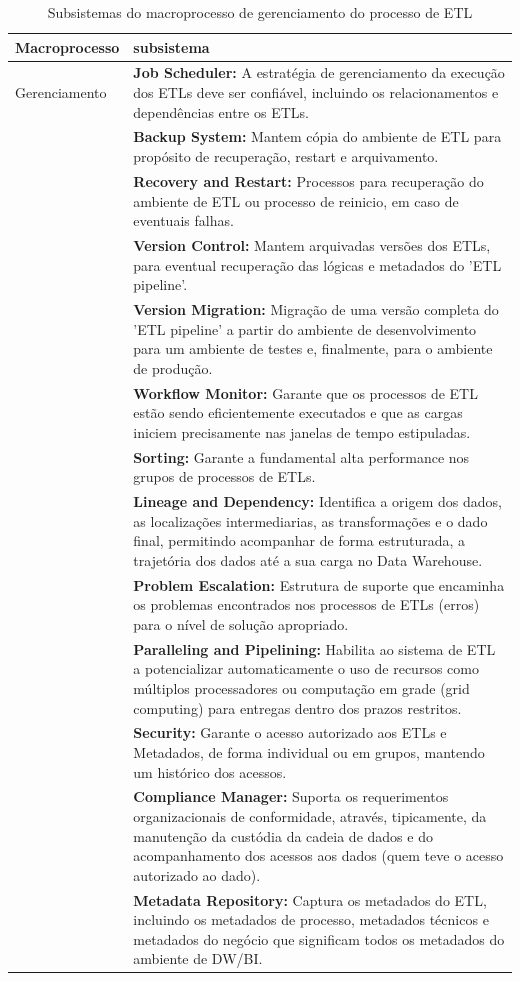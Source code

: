 \clearpage

\begin{table}[h]
	\centering
	\caption{Subsistemas do macroprocesso de gerenciamento do processo de ETL}
	\label{subgerenciamento}
	\begin{tabular}{|p{3cm}| p{11cm} |}
		\hline
		Macroprocesso & subsistema\\
		\hline
		Gerenciamento & \textbf{Job Scheduler:} A estratégia de gerenciamento da execução dos ETLs deve ser confiável, incluindo os relacionamentos e dependências entre os ETLs. \\
		& \textbf{Backup System:} Mantem cópia do ambiente de ETL para propósito de recuperação, restart e arquivamento. \\
		& \textbf{Recovery and Restart:} Processos para recuperação do ambiente de ETL  ou processo de reinicio, em caso de eventuais falhas. \\
		& \textbf{Version Control:} Mantem arquivadas versões dos ETLs, para eventual recuperação das lógicas e metadados do 'ETL pipeline'. \\
		& \textbf{Version Migration:} Migração de uma versão completa do 'ETL pipeline' a partir do ambiente de desenvolvimento para um ambiente de testes e, finalmente, para o ambiente de produção. \\
		& \textbf{Workflow Monitor:} Garante que os processos de ETL estão sendo eficientemente executados e que as cargas iniciem precisamente nas janelas de tempo estipuladas.  \\
		& \textbf{Sorting:} Garante a fundamental alta performance nos grupos de processos de ETLs. \\
		& \textbf{Lineage and Dependency:} Identifica a origem dos dados, as localizações intermediarias, as transformações e o dado final, permitindo acompanhar de forma estruturada, a trajetória dos dados até a sua carga no Data Warehouse. \\
		& \textbf{Problem Escalation:} Estrutura de suporte que  encaminha os problemas encontrados nos processos de  ETLs (erros)  para o nível de solução apropriado. \\
		& \textbf{Paralleling and Pipelining:} Habilita ao sistema de ETL a potencializar automaticamente  o uso de recursos como múltiplos processadores ou computação em grade (grid computing) para entregas dentro dos prazos restritos. \\
		& \textbf{Security:} Garante o acesso autorizado aos ETLs e Metadados, de forma individual ou em grupos, mantendo um histórico dos acessos.\\
		& \textbf{Compliance Manager:} Suporta os requerimentos organizacionais de conformidade, através, tipicamente, da manutenção da custódia da cadeia de dados e do acompanhamento dos acessos aos dados (quem teve o acesso autorizado ao dado). \\
		& \textbf{Metadata Repository:} Captura os metadados do ETL, incluindo os metadados de processo, metadados técnicos e metadados do negócio que significam todos os metadados do ambiente de DW/BI.\\
		\hline
		
	\end{tabular}
\end{table}

